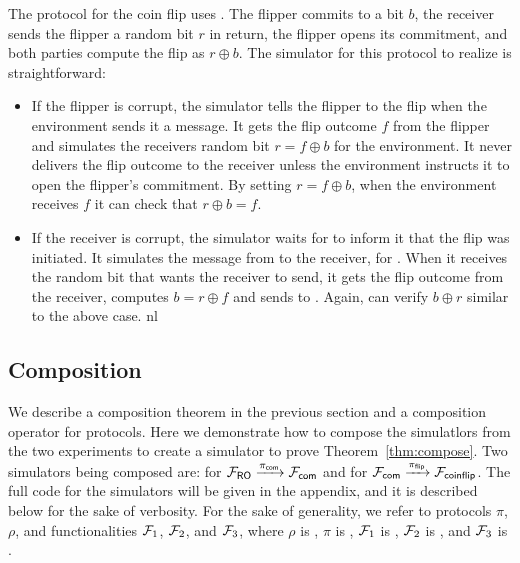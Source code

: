 
The protocol for the coin flip uses \Fcom. 
The flipper commits to a bit $b$, the receiver sends the flipper a random bit $r$ in return, the flipper opens its commitment, and both parties compute the flip as $r \oplus b$.
The simulator for this protocol to realize \Fflip is straightforward:
\begin{itemize}
\item If the flipper is corrupt, the simulator tells the flipper to  the flip when the environment sends it a  message. It gets the flip outcome $f$ from the flipper and simulates the receivers random bit $r = f \oplus b$ for the environment. It never delivers the flip outcome to the receiver unless the environment instructs it to open the flipper's commitment. By setting $r = f \oplus b$, when the environment receives $f$ it can check that $r \oplus b = f$.
\item If the receiver is corrupt, the simulator waits for \Fflip to inform it that the flip was initiated. It simulates the  message from \Fcom to the receiver, for \Z. When it receives the random bit that \Z wants the receiver to send, it gets the flip outcome from the receiver, computes $b = r \oplus f$ and sends  to \Z. Again, \Z can verify $b \oplus r$ similar to the above case.
nl
\end{itemize}

\subsection{Composition}
We describe a composition theorem in the previous section and a composition operator for protocols.
Here we demonstrate how to compose the simulatlors from the two experiments to create a simulator to prove Theorem~\ref{thm:compose}.
Two simulators being composed are:  for $\mathcal{F}_{{\mathsf {RO}}} \xrightarrow{\pi_{{\mathsf {com}}}} \mathcal{F}_{{\mathsf {com}}}$ and  for $\mathcal{F}_{{\mathsf {com}}} \xrightarrow{\pi_{{\mathsf {flip}}}} \mathcal{F}_{{\mathsf {coinflip}}}$. 
The full code for the simulators will be given in the appendix, and it is described below for the sake of verbosity.
For the sake of generality, we refer to protocols $\pi$, $\rho$, and functionalities $\mathcal{F}_1$, $\mathcal{F}_2$, and $\mathcal{F}_3$, where $\rho$ is , $\pi$ is , $\mathcal{F}_1$ is \Fro, $\mathcal{F}_2$ is \Fcom, and $\mathcal{F}_3$ is \Fflip.


